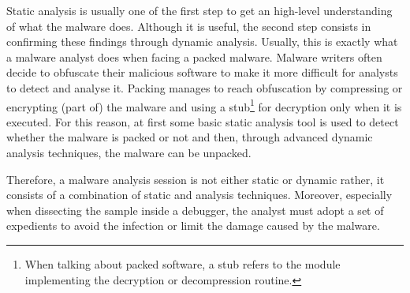 \documentclass[LaM,binding=0.6cm]{sapthesis}
\begin{document}
\newpage
\noindent
Static analysis is usually one of the first step to get an high-level understanding of what the malware does. Although it is useful, the second step consists in confirming these findings through dynamic analysis. Usually, this is exactly what a malware analyst does when facing a packed malware. Malware writers often decide to obfuscate their malicious software to make it more difficult for analysts to detect and analyse it. Packing manages to reach obfuscation by compressing or encrypting (part of) the malware and using a stub\footnote{When talking about packed software, a stub refers to the module implementing the decryption or decompression routine.} for decryption only when it is executed. For this reason, at first some basic static analysis tool is used to detect whether the malware is packed or not and then, through advanced dynamic analysis techniques, the malware can be unpacked.

Therefore, a malware analysis session is not either static or dynamic rather, it consists of a combination of static and analysis techniques. Moreover, especially when dissecting the sample inside a debugger, the analyst must adopt a set of expedients to avoid the infection or limit the damage caused by the malware.
\end{document}

